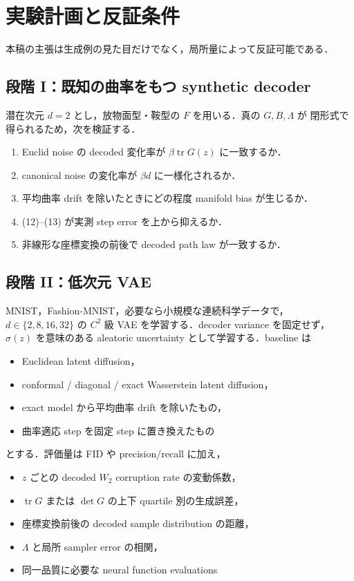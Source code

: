 \documentclass[uplatex,dvipdfmx,11pt,a4paper]{jsarticle}
\begin{document}
\section{実験計画と反証条件}
\label{sec:experiments}

本稿の主張は生成例の見た目だけでなく，局所量によって反証可能である．

\subsection{段階 I：既知の曲率をもつ synthetic decoder}

潜在次元 $d=2$ とし，放物面型・鞍型の $F$ を用いる．真の $G,B,\Lambda$ が
閉形式で得られるため，次を検証する．

\begin{enumerate}
  \item Euclid noise の decoded 変化率が $\beta\operatorname{tr}G(z)$ に一致するか．
  \item canonical noise の変化率が $\beta d$ に一様化されるか．
  \item 平均曲率 drift を除いたときにどの程度 manifold bias が生じるか．
  \item (12)--(13) が実測 step error を上から抑えるか．
  \item 非線形な座標変換の前後で decoded path law が一致するか．
\end{enumerate}

\subsection{段階 II：低次元 VAE}

MNIST，Fashion-MNIST，必要なら小規模な連続科学データで，
$d\in\{2,8,16,32\}$ の $C^2$ 級 VAE を学習する．decoder variance を固定せず，
$\sigma(z)$ を意味のある aleatoric uncertainty として学習する．baseline は

\begin{itemize}
  \item Euclidean latent diffusion，
  \item conformal / diagonal / exact Wasserstein latent diffusion，
  \item exact model から平均曲率 drift を除いたもの，
  \item 曲率適応 step を固定 step に置き換えたもの
\end{itemize}

とする．評価量は FID や precision/recall に加え，

\begin{itemize}
  \item $z$ ごとの decoded $W_2$ corruption rate の変動係数，
  \item $\operatorname{tr}G$ または $\det G$ の上下 quartile 別の生成誤差，
  \item 座標変換前後の decoded sample distribution の距離，
  \item $\Lambda$ と局所 sampler error の相関，
  \item 同一品質に必要な neural function evaluations
\end{itemize}
\end{document}
